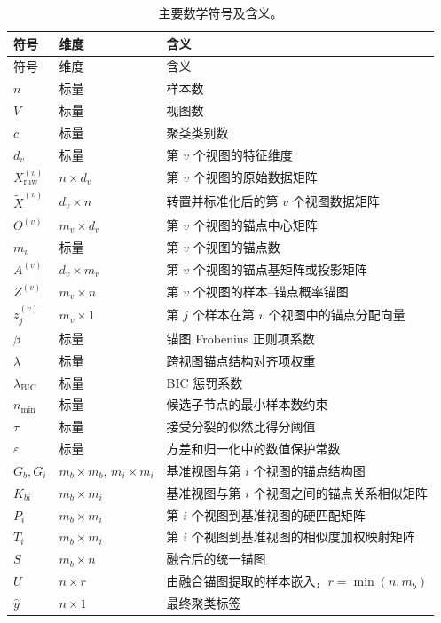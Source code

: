 \documentclass[UTF8,a4paper,12pt,fontset=none]{ctexart}
\newcommand{\epsv}{\varepsilon}
\newcommand{\BIC}{\mathrm{BIC}}
\begin{document}
\begin{longtable}{>{\centering\arraybackslash}p{}
                  >{\centering\arraybackslash}p{}
                  p{}}
\caption{主要数学符号及含义。}\\
\toprule
符号 & 维度 & 含义\\
\midrule
\endfirsthead
\toprule
符号 & 维度 & 含义\\
\midrule
\endhead
\bottomrule
\endfoot
\(n\) & 标量 & 样本数\\
\(V\) & 标量 & 视图数\\
\(c\) & 标量 & 聚类类别数\\
\(d_v\) & 标量 & 第 \(v\) 个视图的特征维度\\
\(X_{\mathrm{raw}}^{(v)}\) & \(n\times d_v\) & 第 \(v\) 个视图的原始数据矩阵\\
\(\widetilde X^{(v)}\) & \(d_v\times n\) & 转置并标准化后的第 \(v\) 个视图数据矩阵\\
\(\Theta^{(v)}\) & \(m_v\times d_v\) & 第 \(v\) 个视图的锚点中心矩阵\\
\(m_v\) & 标量 & 第 \(v\) 个视图的锚点数\\
\(A^{(v)}\) & \(d_v\times m_v\) & 第 \(v\) 个视图的锚点基矩阵或投影矩阵\\
\(Z^{(v)}\) & \(m_v\times n\) & 第 \(v\) 个视图的样本--锚点概率锚图\\
\(z_j^{(v)}\) & \(m_v\times 1\) & 第 \(j\) 个样本在第 \(v\) 个视图中的锚点分配向量\\
\(\beta\) & 标量 & 锚图 Frobenius 正则项系数\\
\(\lambda\) & 标量 & 跨视图锚点结构对齐项权重\\
\(\lambda_{\BIC}\) & 标量 & BIC 惩罚系数\\
\(n_{\min}\) & 标量 & 候选子节点的最小样本数约束\\
\(\tau\) & 标量 & 接受分裂的似然比得分阈值\\
\(\epsv\) & 标量 & 方差和归一化中的数值保护常数\\
\(G_b,G_i\) & \(m_b\times m_b\), \(m_i\times m_i\) & 基准视图与第 \(i\) 个视图的锚点结构图\\
\(K_{bi}\) & \(m_b\times m_i\) & 基准视图与第 \(i\) 个视图之间的锚点关系相似矩阵\\
\(P_i\) & \(m_b\times m_i\) & 第 \(i\) 个视图到基准视图的硬匹配矩阵\\
\(T_i\) & \(m_b\times m_i\) & 第 \(i\) 个视图到基准视图的相似度加权映射矩阵\\
\(S\) & \(m_b\times n\) & 融合后的统一锚图\\
\(U\) & \(n\times r\) & 由融合锚图提取的样本嵌入，\(r=\min(n,m_b)\)\\
\(\hat y\) & \(n\times 1\) & 最终聚类标签\\
\end{longtable}
\end{document}
